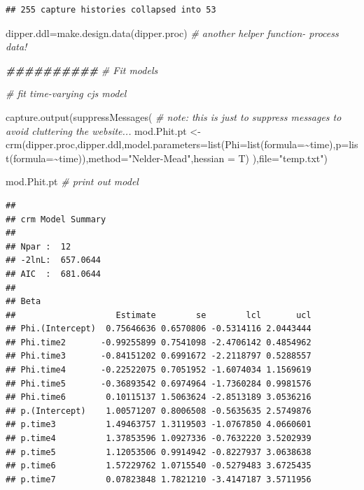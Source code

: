 \documentclass[
]{article}
\newenvironment{Shaded}{\begin{snugshade}}{\end{snugshade}}
\newcommand{\AttributeTok}[1]{\textcolor[rgb]{0.77,0.63,0.00}{#1}}
\newcommand{\CommentTok}[1]{\textcolor[rgb]{0.56,0.35,0.01}{\textit{#1}}}
\newcommand{\DocumentationTok}[1]{\textcolor[rgb]{0.56,0.35,0.01}{\textbf{\textit{#1}}}}
\newcommand{\FunctionTok}[1]{\textcolor[rgb]{0.00,0.00,0.00}{#1}}
\newcommand{\NormalTok}[1]{#1}
\newcommand{\OtherTok}[1]{\textcolor[rgb]{0.56,0.35,0.01}{#1}}
\newcommand{\SpecialCharTok}[1]{\textcolor[rgb]{0.00,0.00,0.00}{#1}}
\newcommand{\StringTok}[1]{\textcolor[rgb]{0.31,0.60,0.02}{#1}}
\begin{document}
\begin{verbatim}
## 255 capture histories collapsed into 53
\end{verbatim}

\begin{Shaded}
\begin{Highlighting}[]
\NormalTok{dipper.ddl}\OtherTok{=}\FunctionTok{make.design.data}\NormalTok{(dipper.proc)    }\CommentTok{\# another helper function{-} process data!}

\DocumentationTok{\#\#\#\#\#\#\#\#\#\#}
\CommentTok{\# Fit models}

\CommentTok{\# fit time{-}varying cjs model}


\FunctionTok{capture.output}\NormalTok{(}\FunctionTok{suppressMessages}\NormalTok{(   }\CommentTok{\# note: this is just to suppress messages to avoid cluttering the website...}
\NormalTok{      mod.Phit.pt }\OtherTok{\textless{}{-}}  \FunctionTok{crm}\NormalTok{(dipper.proc,dipper.ddl,}\AttributeTok{model.parameters=}\FunctionTok{list}\NormalTok{(}\AttributeTok{Phi=}\FunctionTok{list}\NormalTok{(}\AttributeTok{formula=}\SpecialCharTok{\textasciitilde{}}\NormalTok{time),}\AttributeTok{p=}\FunctionTok{list}\NormalTok{(}\AttributeTok{formula=}\SpecialCharTok{\textasciitilde{}}\NormalTok{time)),}\AttributeTok{method=}\StringTok{"Nelder{-}Mead"}\NormalTok{,}\AttributeTok{hessian =}\NormalTok{ T)}
\NormalTok{),}\AttributeTok{file=}\StringTok{"temp.txt"}\NormalTok{) }

\NormalTok{mod.Phit.pt   }\CommentTok{\# print out model}
\end{Highlighting}
\end{Shaded}

\begin{verbatim}
## 
## crm Model Summary
## 
## Npar :  12
## -2lnL:  657.0644
## AIC  :  681.0644
## 
## Beta
##                    Estimate        se        lcl       ucl
## Phi.(Intercept)  0.75646636 0.6570806 -0.5314116 2.0443444
## Phi.time2       -0.99255899 0.7541098 -2.4706142 0.4854962
## Phi.time3       -0.84151202 0.6991672 -2.2118797 0.5288557
## Phi.time4       -0.22522075 0.7051952 -1.6074034 1.1569619
## Phi.time5       -0.36893542 0.6974964 -1.7360284 0.9981576
## Phi.time6        0.10115137 1.5063624 -2.8513189 3.0536216
## p.(Intercept)    1.00571207 0.8006508 -0.5635635 2.5749876
## p.time3          1.49463757 1.3119503 -1.0767850 4.0660601
## p.time4          1.37853596 1.0927336 -0.7632220 3.5202939
## p.time5          1.12053506 0.9914942 -0.8227937 3.0638638
## p.time6          1.57229762 1.0715540 -0.5279483 3.6725435
## p.time7          0.07823848 1.7821210 -3.4147187 3.5711956
\end{verbatim}
\end{document}
